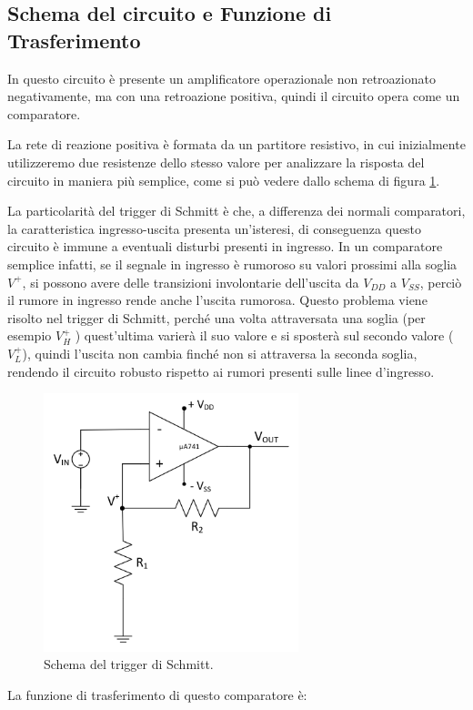 \documentclass{report}
\begin{document}
\subsection{Schema del circuito e Funzione di Trasferimento}
In questo circuito è presente un amplificatore operazionale non retroazionato negativamente, ma con una retroazione positiva, quindi il circuito opera come un comparatore.\par
La rete di reazione positiva è formata da un partitore resistivo, in cui inizialmente utilizzeremo due resistenze dello stesso valore per analizzare la risposta del circuito in maniera più semplice, come si può vedere dallo schema di figura \ref{figura:schema2}.\par
La particolarità del trigger di Schmitt è che, a differenza dei normali comparatori, la caratteristica ingresso-uscita presenta un'isteresi, di conseguenza questo circuito è immune a eventuali disturbi presenti in ingresso. In un comparatore semplice infatti, se il segnale in ingresso è rumoroso su valori prossimi alla soglia ${V^+}$, si possono avere delle transizioni involontarie dell'uscita da ${V_{DD}}$ a ${V_{SS}}$, perciò il rumore in ingresso rende anche l'uscita rumorosa. Questo problema viene risolto nel trigger di Schmitt, perché una volta attraversata una soglia (per esempio ${V_H^+}$ ) quest'ultima varierà il suo valore e si sposterà sul secondo valore (${V_L^+}$), quindi l'uscita non cambia finché non si attraversa la seconda soglia, rendendo il circuito robusto rispetto ai rumori presenti sulle linee d'ingresso.\par
\begin{figure}[h]
	\centering
	\includegraphics[height=7.5cm]{immagini/schema2}
	\caption{Schema del trigger di Schmitt.}
	\label{figura:schema2}
\end{figure}
La funzione di trasferimento di questo comparatore è:\\
\end{document}
